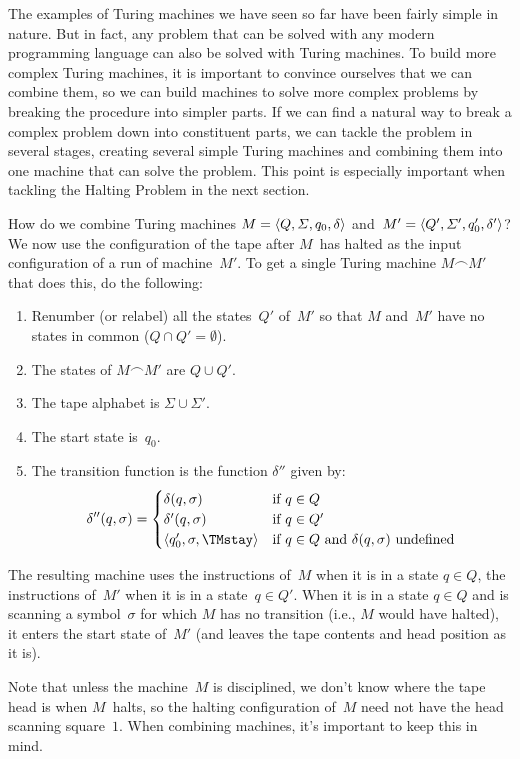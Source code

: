 \documentclass[../../../include/open-logic-section]{subfiles}
\begin{document}

\begin{explain}
The examples of Turing machines we have seen so far have been fairly
simple in nature. But in fact, any problem that can be solved with any
modern programming language can also be solved with Turing machines.
To build more complex Turing machines, it is important to convince
ourselves that we can combine them, so we can build machines to solve
more complex problems by breaking the procedure into simpler parts.
If we can find a natural way to break a complex problem down into
constituent parts, we can tackle the problem in several stages,
creating several simple Turing machines and combining them into one
machine that can solve the problem. This point is especially important
when tackling the Halting Problem in the next section.

How do we combine Turing machines $M = \langle Q, \Sigma, q_0, \delta \rangle$
and~$M' = \langle Q', \Sigma', q_0', \delta' \rangle$?  We now use the
configuration of the tape after $M$~has halted as the input
configuration of a run of machine~$M'$.  To get a single Turing
machine $M \frown M'$ that does this, do the following:
\begin{enumerate}
    \item Renumber (or relabel) all the states~$Q'$ of~$M'$ so that $M$
    and~$M'$ have no states in common ($Q \cap Q' = \emptyset$).
    \item The states of $M \frown M'$ are $Q \cup Q'$.
    \item The tape alphabet is $\Sigma \cup \Sigma'$.
    \item The start state is~$q_0$.
    \item The transition function is the function $\delta''$ given by:
    \[\delta''(q,\sigma) =
    \begin{cases}
      \delta(q,\sigma) & \text{if $q \in Q$}\\
      \delta'(q,\sigma) & \text{if $q \in Q'$}\\
      \tuple{q_0', \sigma, \TMstay} & \text{if $q \in Q$ and
      $\delta(q,\sigma)$ undefined}
    \end{cases}\]
\end{enumerate}
The resulting machine uses the instructions of~$M$ when it is in a
state $q \in Q$, the instructions of~$M'$ when it is in a state~$q \in
Q'$. When it is in a state $q \in Q$ and is scanning a symbol~$\sigma$
for which $M$ has no transition (i.e., $M$ would have halted), it
enters the start state of~$M'$ (and leaves the tape contents and head
position as it is).

Note that unless the machine~$M$ is disciplined, we don't know where
the tape head is when $M$~halts, so the halting configuration of~$M$
need not have the head scanning square~$1$. When combining machines,
it's important to keep this in mind.
\end{explain}
\end{document}
